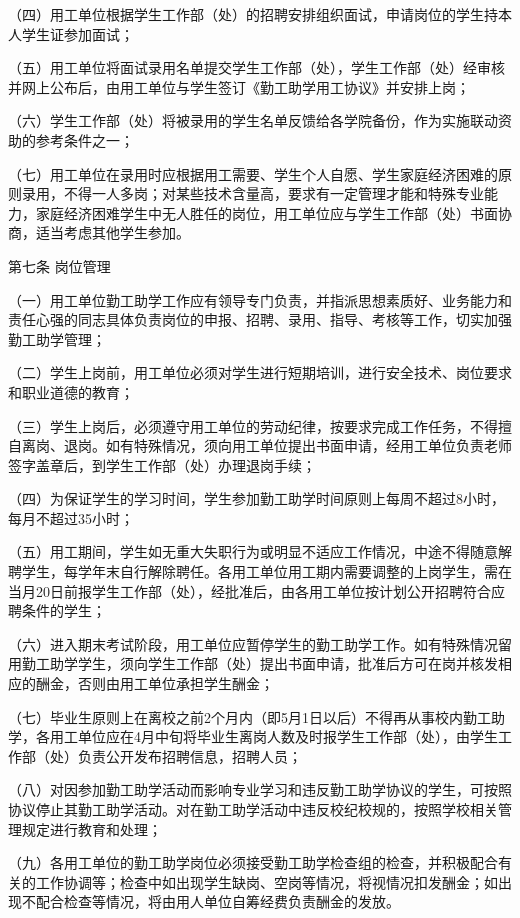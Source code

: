 \documentclass[UTF8,12pt,a4paper]{report}
\begin{document}
（四）用工单位根据学生工作部（处）的招聘安排组织面试，申请岗位的学生持本人学生证参加面试；

（五）用工单位将面试录用名单提交学生工作部（处），学生工作部（处）经审核并网上公布后，由用工单位与学生签订《勤工助学用工协议》并安排上岗；

（六）学生工作部（处）将被录用的学生名单反馈给各学院备份，作为实施联动资助的参考条件之一；

（七）用工单位在录用时应根据用工需要、学生个人自愿、学生家庭经济困难的原则录用，不得一人多岗；对某些技术含量高，要求有一定管理才能和特殊专业能力，家庭经济困难学生中无人胜任的岗位，用工单位应与学生工作部（处）书面协商，适当考虑其他学生参加。

第七条 岗位管理

（一）用工单位勤工助学工作应有领导专门负责，并指派思想素质好、业务能力和责任心强的同志具体负责岗位的申报、招聘、录用、指导、考核等工作，切实加强勤工助学管理；

（二）学生上岗前，用工单位必须对学生进行短期培训，进行安全技术、岗位要求和职业道德的教育；

（三）学生上岗后，必须遵守用工单位的劳动纪律，按要求完成工作任务，不得擅自离岗、退岗。如有特殊情况，须向用工单位提出书面申请，经用工单位负责老师签字盖章后，到学生工作部（处）办理退岗手续；

（四）为保证学生的学习时间，学生参加勤工助学时间原则上每周不超过8小时，每月不超过35小时；

（五）用工期间，学生如无重大失职行为或明显不适应工作情况，中途不得随意解聘学生，每学年末自行解除聘任。各用工单位用工期内需要调整的上岗学生，需在当月20日前报学生工作部（处），经批准后，由各用工单位按计划公开招聘符合应聘条件的学生；

（六）进入期末考试阶段，用工单位应暂停学生的勤工助学工作。如有特殊情况留用勤工助学学生，须向学生工作部（处）提出书面申请，批准后方可在岗并核发相应的酬金，否则由用工单位承担学生酬金；

（七）毕业生原则上在离校之前2个月内（即5月1日以后）不得再从事校内勤工助学，各用工单位应在4月中旬将毕业生离岗人数及时报学生工作部（处），由学生工作部（处）负责公开发布招聘信息，招聘人员；

（八）对因参加勤工助学活动而影响专业学习和违反勤工助学协议的学生，可按照协议停止其勤工助学活动。对在勤工助学活动中违反校纪校规的，按照学校相关管理规定进行教育和处理；

（九）各用工单位的勤工助学岗位必须接受勤工助学检查组的检查，并积极配合有关的工作协调等；检查中如出现学生缺岗、空岗等情况，将视情况扣发酬金；如出现不配合检查等情况，将由用人单位自筹经费负责酬金的发放。
\end{document}
